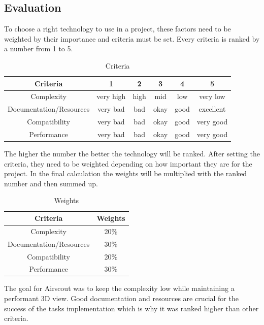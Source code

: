\subsection{Evaluation}

To choose a right technology to use in a project, these factors need to be weighted by their importance and criteria must be set. Every criteria is ranked by a number from 1 to 5.

\begin{table}[ht!]
  \centering
  \begin{tabular}{c|c|c|c|c|c} %
  \hline %
  Criteria & 1 & 2 & 3 & 4 & 5 \\
  \hline %
  Complexity & very high & high & mid & low & very low \\
  Documentation/Resources & very bad & bad & okay & good & excellent \\
  Compatibility & very bad & bad & okay & good & very good \\
  Performance & very bad & bad & okay & good & very good \\
  \hline %
  \end{tabular}
  \caption{Criteria}
\end{table}

The higher the number the better the technology will be ranked. After setting the criteria, they need to be weighted depending on how important they are for the project. In the final calculation the weights will be multiplied with the ranked number and then summed up. 

\begin{table}[ht!]
  \centering
  \begin{tabular}{c|c} %
  \hline %
  Criteria & Weights \\
  \hline %
  Complexity & 20\% \\
  Documentation/Resources & 30\% \\
  Compatibility & 20\% \\
  Performance & 30\% \\
  \hline %
  \end{tabular}
  \caption{Weights}
\end{table}

The goal for Airscout was to keep the complexity low while maintaining a performant 3D view. Good documentation and resources are crucial for the success of the tasks implementation which is why it was ranked higher than other criteria.

